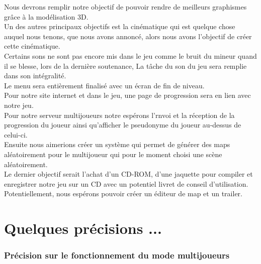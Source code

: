 \documentclass[titlepage, 13px, a4paper]{article}
\begin{document}
Nous devrons remplir notre objectif de pouvoir rendre de meilleurs graphismes grâce à la modélisation 3D. \\

Un des autres principaux objectifs est la cinématique qui est quelque chose auquel nous tenons, que nous avons annoncé, 
alors nous avons l'objectif de créer cette cinématique. \\

Certains sons ne sont pas encore mis dans le jeu comme le bruit du mineur quand il se blesse, lors de la dernière soutenance, 
La tâche du son du jeu sera remplie dans son intégralité. \\

Le menu sera entièrement finalisé avec un écran de fin de niveau. \\

Pour notre site internet et dans le jeu, une page de progression sera en lien avec notre jeu. \\

Pour notre serveur multijoueurs notre espérons l'rnvoi et la réception de la progression du joueur ainsi qu’afficher 
le pseudonyme du joueur au-dessus de celui-ci. \\

Ensuite nous aimerions créer un système qui permet de générer des maps aléatoirement pour le multijoueur qui pour 
le moment choisi une scène aléatoirement. \\

Le dernier objectif serait l'achat d'un CD-ROM, d'une jaquette pour compiler et enregistrer notre jeu sur un CD avec 
un potentiel livret de conseil d'utilisation. \\

Potentiellement, nous espérons pouvoir créer un éditeur de map et un trailer. \\


\newpage





\part{Quelques précisions ...}

\section{Précision sur le fonctionnement du mode multijoueurs}
\end{document}
